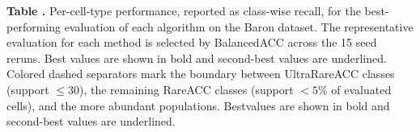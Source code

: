 \documentclass[11pt,a4paper]{article}
\begin{document}

\vspace{\baselineskip}
\noindent\textbf{Table \thetable.}
Per-cell-type performance, reported as class-wise recall, for the best-performing evaluation of each algorithm on the Baron dataset. The representative evaluation for each method is selected by BalancedACC across the 15 seed reruns. Best values are shown in bold and second-best values are underlined. Colored dashed separators mark the boundary between UltraRareACC classes (support $\leq 30$), the remaining RareACC classes (support $< 5\%$ of evaluated cells), and the more abundant populations. Bestvalues are shown in bold and second-best values are underlined.
\label{tab:rare_population_compare}
\end{document}
